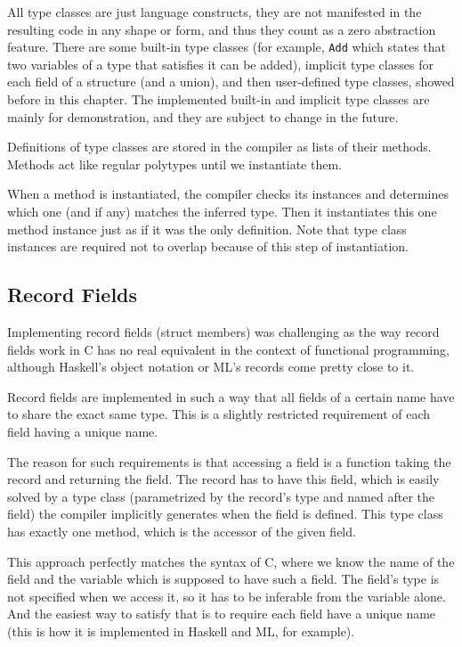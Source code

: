 All type classes are just language constructs, they are not manifested in the resulting code in any shape or form, and thus they count as a zero abstraction feature. There are some built-in type classes (for example, \lstinline{Add} which states that two variables of a type that satisfies it can be added), implicit type classes for each field of a structure (and a union), and then user-defined type classes, showed before in this chapter. The implemented built-in and implicit type classes are mainly for demonstration, and they are subject to change in the future.

Definitions of type classes are stored in the compiler as lists of their methods. Methods act like regular polytypes until we instantiate them.

When a method is instantiated, the compiler checks its instances and determines which one (and if any) matches the inferred type. Then it instantiates this one method instance just as if it was the only definition. Note that type class instances are required not to overlap because of this step of instantiation.

\subsection{Record Fields}
\label{ssec:recordFieldsCHM}

Implementing record fields (struct members) was challenging as the way record fields work in C has no real equivalent in the context of functional programming, although Haskell's object notation or ML's records come pretty close to it.

Record fields are implemented in such a way that all fields of a certain name have to share the exact same type. This is a slightly restricted requirement of each field having a unique name.

The reason for such requirements is that accessing a field is a function taking the record and returning the field. The record has to have this field, which is easily solved by a type class (parametrized by the record's type and named after the field) the compiler implicitly generates when the field is defined. This type class has exactly one method, which is the accessor of the given field.

This approach perfectly matches the syntax of C, where we know the name of the field and the variable which is supposed to have such a field. The field's type is not specified when we access it, so it has to be inferable from the variable alone. And the easiest way to satisfy that is to require each field have a unique name (this is how it is implemented in Haskell and ML, for example).

